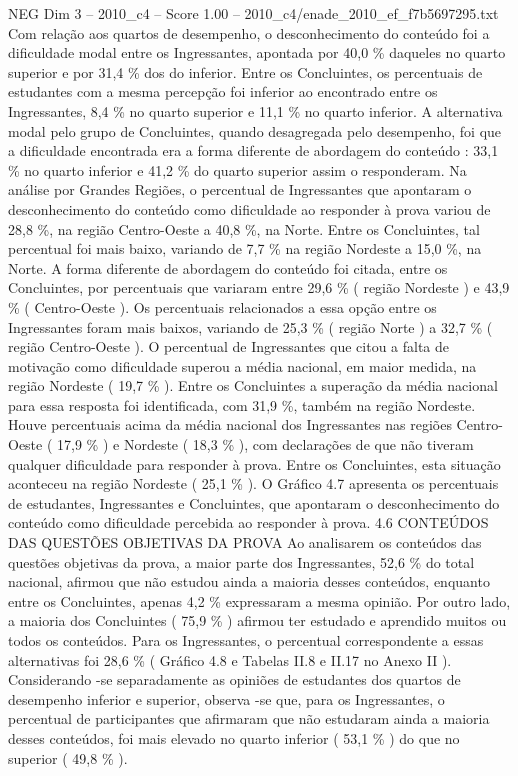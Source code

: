 \begin{textsample}{NEG Dim 3 – 2010\_c4 – Score 1.00 – 2010\_c4/enade\_2010\_ef\_f7b5697295.txt}
Com relação aos quartos de desempenho, o desconhecimento do conteúdo foi a dificuldade modal entre os Ingressantes, apontada por 40,0 \% daqueles no quarto superior e por 31,4 \% dos do inferior.
Entre os Concluintes, os percentuais de estudantes com a mesma percepção foi inferior ao encontrado entre os Ingressantes, 8,4 \% no quarto superior e 11,1 \% no quarto inferior.
A alternativa modal pelo grupo de Concluintes, quando desagregada pelo desempenho, foi que a dificuldade encontrada era a forma diferente de abordagem do conteúdo : 33,1 \% no quarto inferior e 41,2 \% do quarto superior assim o responderam.
Na análise por Grandes Regiões, o percentual de Ingressantes que apontaram o desconhecimento do conteúdo como dificuldade ao responder à prova variou de 28,8 \%, na região Centro-Oeste a 40,8 \%, na Norte.
Entre os Concluintes, tal percentual foi mais baixo, variando de 7,7 \% na região Nordeste a 15,0 \%, na Norte.
A forma diferente de abordagem do conteúdo foi citada, entre os Concluintes, por percentuais que variaram entre 29,6 \% ( região Nordeste ) e 43,9 \% ( Centro-Oeste ).
Os percentuais relacionados a essa opção entre os Ingressantes foram mais baixos, variando de 25,3 \% ( região Norte ) a 32,7 \% ( região Centro-Oeste ).
O percentual de Ingressantes que citou a falta de motivação como dificuldade superou a média nacional, em maior medida, na região Nordeste ( 19,7 \% ).
Entre os Concluintes a superação da média nacional para essa resposta foi identificada, com 31,9 \%, também na região Nordeste.
Houve percentuais acima da média nacional dos Ingressantes nas regiões Centro-Oeste ( 17,9 \% ) e Nordeste ( 18,3 \% ), com declarações de que não tiveram qualquer dificuldade para responder à prova.
Entre os Concluintes, esta situação aconteceu na região Nordeste ( 25,1 \% ).
O Gráfico 4.7 apresenta os percentuais de estudantes, Ingressantes e Concluintes, que apontaram o desconhecimento do conteúdo como dificuldade percebida ao responder à prova. 4.6 CONTEÚDOS DAS QUESTÕES OBJETIVAS DA PROVA Ao analisarem os conteúdos das questões objetivas da prova, a maior parte dos Ingressantes, 52,6 \% do total nacional, afirmou que não estudou ainda a maioria desses conteúdos, enquanto entre os Concluintes, apenas 4,2 \% expressaram a mesma opinião.
Por outro lado, a maioria dos Concluintes ( 75,9 \% ) afirmou ter estudado e aprendido muitos ou todos os conteúdos.
Para os Ingressantes, o percentual correspondente a essas alternativas foi 28,6 \% ( Gráfico 4.8 e Tabelas II.8 e II.17 no Anexo II ).
Considerando -se separadamente as opiniões de estudantes dos quartos de desempenho inferior e superior, observa -se que, para os Ingressantes, o percentual de participantes que afirmaram que não estudaram ainda a maioria desses conteúdos, foi mais elevado no quarto inferior ( 53,1 \% ) do que no superior ( 49,8 \% ).

\end{textsample}
